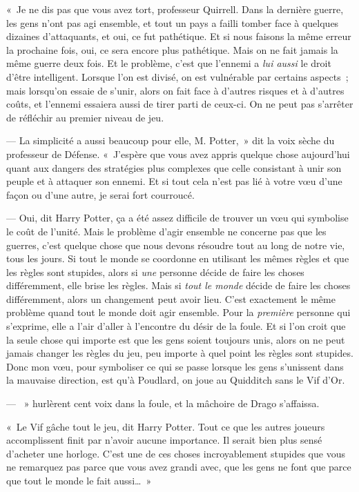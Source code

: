 «~Je ne dis pas que vous avez tort, professeur Quirrell. Dans la dernière guerre, les gens n'ont pas agi ensemble, et tout un pays a failli tomber face à quelques dizaines d'attaquants, et oui, ce fut pathétique. Et si nous faisons la même erreur la prochaine fois, oui, ce sera encore plus pathétique. Mais on ne fait jamais la même guerre deux fois. Et le problème, c'est que l'ennemi a \emph{lui aussi} le droit d'être intelligent. Lorsque l'on est divisé, on est vulnérable par certains aspects~; mais lorsqu'on essaie de s'unir, alors on fait face à d'autres risques et à d'autres coûts, et l'ennemi essaiera aussi de tirer parti de ceux-ci. On ne peut pas s'arrêter de réfléchir au premier niveau de jeu.

--- La simplicité a aussi beaucoup pour elle, M. Potter,~» dit la voix sèche du professeur de Défense. «~J'espère que vous avez appris quelque chose aujourd'hui quant aux dangers des stratégies plus complexes que celle consistant à unir son peuple et à attaquer son ennemi. Et si tout cela n'est pas lié à votre vœu d'une façon ou d'une autre, je serai fort courroucé.

--- Oui, dit Harry Potter, ça a été assez difficile de trouver un vœu qui symbolise le coût de l'unité. Mais le problème d'agir ensemble ne concerne pas que les guerres, c'est quelque chose que nous devons résoudre tout au long de notre vie, tous les jours. Si tout le monde se coordonne en utilisant les mêmes règles et que les règles sont stupides, alors si \emph{une} personne décide de faire les choses différemment, elle brise les règles. Mais si \emph{tout le monde} décide de faire les choses différemment, alors un changement peut avoir lieu. C'est exactement le même problème quand tout le monde doit agir ensemble. Pour la \emph{première} personne qui s'exprime, elle a l'air d'aller à l'encontre du désir de la foule. Et si l'on croit que la seule chose qui importe est que les gens soient toujours unis, alors on ne peut jamais changer les règles du jeu, peu importe à quel point les règles sont stupides. Donc mon vœu, pour symboliser ce qui se passe lorsque les gens s'unissent dans la mauvaise direction, est qu'à Poudlard, on joue au Quidditch sans le Vif d'Or.

--- ~» hurlèrent cent voix dans la foule, et la mâchoire de Drago s'affaissa.

«~Le Vif gâche tout le jeu, dit Harry Potter. Tout ce que les autres joueurs accomplissent finit par n'avoir aucune importance. Il serait bien plus sensé d'acheter une horloge. C'est une de ces choses incroyablement stupides que vous ne remarquez pas parce que vous avez grandi avec, que les gens ne font que parce que tout le monde le fait aussi…~»

